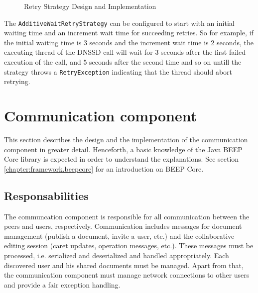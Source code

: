 \begin{figure}[H]
 \centering
 \caption{Retry Strategy Design and Implementation}
 \label{fig:network.discovery.retrystrategy}
\end{figure}

The \texttt{AdditiveWaitRetryStrategy} can be configured to start with an initial waiting time and an increment wait time for succeeding retries. So for example, if the initial waiting time is 3 seconds and the increment wait time is 2 seconds, the executing thread of the DNSSD call will wait for 3 seconds after the first failed execution of the call, and 5 seconds after the second time and so on untill the strategy throws a \texttt{RetryException} indicating that the thread should abort retrying.


\newpage

\section{Communication component}
This section describes the design and the implementation of the communication component in greater detail. Henceforth, a basic knowledge of the Java BEEP Core library is expected in order to understand the explanations. See section \ref{chapter:framework.beepcore} for an introduction on BEEP Core.

\subsection{Responsabilities}
The communcation component is responsible for all communication between the peers and users, respectively. Communication includes messages for document management (publish a document, invite a user, etc.) and the collaborative editing session (caret updates, operation messages, etc.). These messages must be processed, i.e. serialized and deserialized and handled appropriately. Each discovered user and his shared documents must be managed. 
Apart from that, the communication component must manage network connections to other users and provide a fair exception handling.

